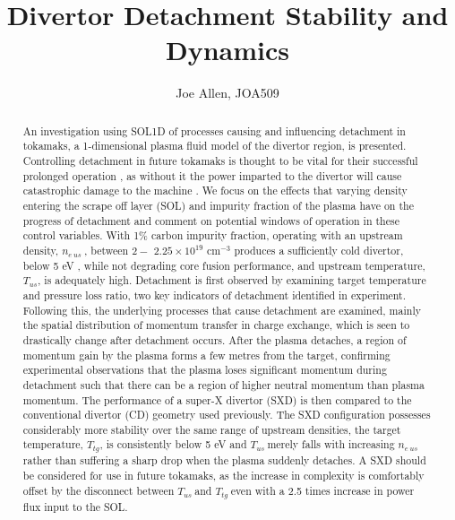 \documentclass[12pt]{article}  %
\providecommand{\noNe}[1]{{${#1}\times 10^{19}$ cm$^{-3}$}} %
\providecommand{\neus}{$n_{e~us}~$} %
\providecommand{\Tus}{$T_{us}~$} %
\providecommand{\Ttg}{$T_{tg}~$} %
\providecommand{\tus}{$T_{us}$} %
\providecommand{\ttg}{$T_{tg}$} %
\begin{document}
\title{Divertor Detachment Stability and Dynamics}
\author{Joe Allen, JOA509}


\pagestyle{empty}
\maketitle
\clearpage
\pagestyle{plain}

\begin{abstract}
\noindent An investigation using SOL1D of processes causing and influencing detachment in tokamaks, a 1-dimensional plasma fluid model of the divertor region, is presented. Controlling detachment in future tokamaks is thought to be vital for their successful prolonged operation \cite{Reimold2015}, as without it the power imparted to the divertor will cause catastrophic damage to the machine \cite{Loarte2007}. We focus on the effects that varying density entering the scrape off layer (SOL) and impurity fraction of the plasma have on the progress of detachment and comment on potential windows of operation in these control variables. With 1\% carbon impurity fraction, operating with an upstream density, \neus, between $2 -$ \noNe{2.25} produces a sufficiently cold divertor, below 5 eV \cite{Porter1996}, while not degrading core fusion performance, and upstream temperature, \tus, is adequately high. Detachment is first observed by examining target temperature and pressure loss ratio, two key indicators of detachment identified in experiment. Following this, the underlying processes that cause detachment are examined, mainly the spatial distribution of momentum transfer in charge exchange, which is seen to drastically change after detachment occurs. After the plasma detaches, a region of momentum gain by the plasma forms a few metres from the target, confirming experimental observations \cite{Loarte1998, Wischmeier2009} that the plasma loses significant momentum during detachment such that there can be a region of higher neutral momentum than plasma momentum. The performance of a super-X divertor (SXD) is then compared to the conventional divertor (CD) geometry used previously. The SXD configuration possesses considerably more stability over the same range of upstream densities, the target temperature, \ttg, is consistently below 5 eV and \Tus merely falls with increasing \neus rather than suffering a sharp drop when the plasma suddenly detaches. A SXD should be considered for use in future tokamaks, as the increase in complexity is comfortably offset by the disconnect between \Tus and \Ttg even with a 2.5 times increase in power flux input to the SOL.
\end{abstract}
\end{document}
